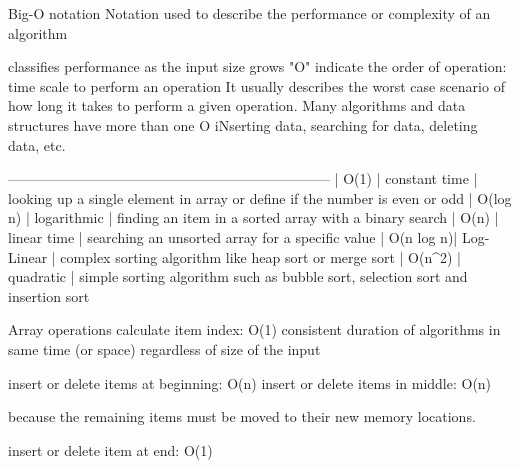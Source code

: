 Big-O notation 
  Notation used to describe the performance or complexity of an algorithm 

        classifies performance as the input size grows 
        "O" indicate the order of operation: time scale to perform an operation 
        It usually describes the worst case scenario of how long it takes to perform a given operation.
    Many algorithms and data structures have more than one O 
        iNserting data, searching for data, deleting data, etc.


    ---------------------------------------------------------------------
    | O(1)      | constant time | looking up a single element in array  or define if the number is even or odd
    | O(log n)  | logarithmic   | finding an item in a sorted array with a binary search 
    | O(n)      | linear time   | searching an unsorted array for a  specific value 
    | O(n log n)| Log-Linear    | complex sorting algorithm like heap sort or merge sort 
    | O(n^2)    | quadratic     | simple sorting algorithm such as bubble sort, selection sort and insertion sort

Array operations 
  calculate item index: 
    O(1)
    consistent duration of algorithms in same time (or space) 
    regardless of size of the input

  insert or delete items at beginning:
    O(n)
  insert or delete items in middle:
    O(n)

    because the remaining items must be moved to their new memory locations. 

  insert or delete item at end: 
  O(1)